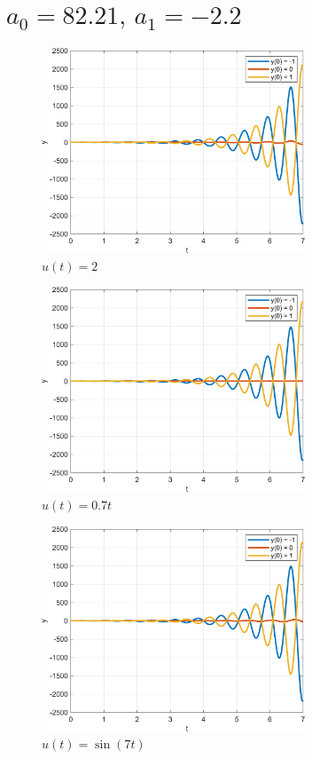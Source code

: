 \newpage
\section{$a_0 = 82.21,\, a_1 = -2.2$}
\begin{figure}[H]
    \centering
    \includegraphics[width=0.7\textwidth, trim={0cm 0cm 0cm 0cm}]{../images/3_1.png}
    \caption{$u(t) = 2$}
    \label{fig:3_1}
\end{figure}

\begin{figure}[H]
    \centering
    \includegraphics[width=0.7\textwidth, trim={0cm 0cm 0cm 0cm}]{../images/3_2.png}
    \caption{$u(t) = 0.7t$}
    \label{fig:3_2}
\end{figure}
 
\newpage
\begin{figure}[H]
    \centering
    \includegraphics[width=0.7\textwidth, trim={0cm 0cm 0cm 0cm}]{../images/3_3.png}
    \caption{$u(t) = \sin(7t)$}
    \label{fig:3_3}
\end{figure}


